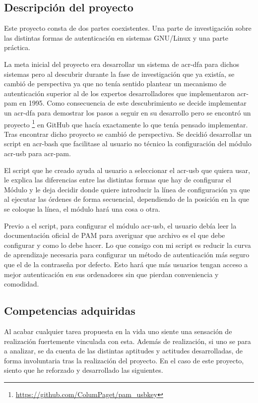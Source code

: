 \documentclass[titlepage, 12pt, a4paper]{article}
\begin{document}
\subsection{Descripción del proyecto}
Este proyecto consta de dos partes coexistentes. Una parte de investigación sobre las distintas formas de autenticación en sistemas \gls{GNU/Linux} y una parte práctica.\par
La meta inicial del proyecto era desarrollar un sistema de \gls{acr-dfa} para dichos sistemas pero al descubrir durante la fase de investigación que ya existía, se cambió de perspectiva ya que no tenía sentido plantear un mecanismo de autenticación superior al de los expertos desarrolladores que implementaron \gls{acr-pam} en 1995. Como consecuencia de este descubrimiento se decide implementar un \gls{acr-dfa} para demostrar los pasos a seguir en su desarrollo pero se encontró un proyecto \footnote{\url{https://github.com/ColumPaget/pam_usbkey}} en \gls{GitHub} que hacía exactamente lo que tenía pensado implementar. Tras encontrar dicho proyecto se cambió de perspectiva. Se decidió desarrollar un \gls{script} en \gls{acr-bash} que facilitase al usuario no técnico la configuración del módulo \gls{acr-usb} para \gls{acr-pam}.\par
El \gls{script} que he creado ayuda al usuario a seleccionar el \gls{acr-usb} que quiera usar, le explica las diferencias entre las distintas formas que hay de configurar el Módulo y le deja decidir donde quiere introducir la línea de configuración ya que al ejecutar las órdenes de forma secuencial, dependiendo de la posición en la que se coloque la línea, el módulo hará una cosa o otra. \par
Previo a el \gls{script}, para configurar el módulo \gls{acr-usb}, el usuario debía leer la documentación oficial de PAM para averiguar que archivo es el que debe configurar y como lo debe hacer. Lo que consigo con mi \gls{script} es reducir la curva de aprendizaje necesaria para configurar un método de autenticación más seguro que el de la contraseña por defecto. Esto hará que más usuarios tengan acceso a mejor autenticación en sus ordenadores sin que pierdan conveniencia y comodidad.
\subsection{Competencias adquiridas}
Al acabar cualquier tarea propuesta en la vida uno siente una sensación de realización fuertemente vinculada con esta. Además de realización, si uno se para a analizar, se da cuenta de las distintas aptitudes y actitudes desarrolladas, de forma involuntaria tras la realización del proyecto. En el caso de este proyecto, siento que he reforzado y desarrollado las siguientes.
\end{document}
